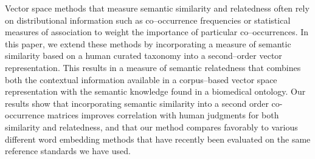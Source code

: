Vector space methods that measure semantic similarity and relatedness often rely on distributional information such as co--occurrence frequencies or statistical measures of association to weight the importance of particular co--occurrences. In this paper, we extend these methods by incorporating a measure of semantic similarity based on a human curated taxonomy into a second--order vector representation. This results in a measure of semantic relatedness that combines both the contextual  information available in a corpus--based vector space representation with the semantic knowledge found in a biomedical ontology. Our results show that incorporating semantic similarity into a second order co-occurrence matrices improves correlation with human judgments for both similarity and relatedness, and that our method compares favorably to various different word embedding methods that have recently been evaluated on the same reference standards we have used.
